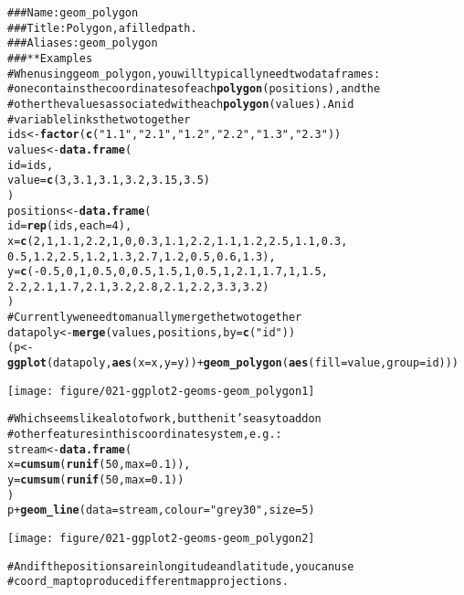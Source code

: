 \documentclass[a4paper,titlepage]{tufte-handout}\usepackage{graphicx, color}
\makeatletter
\def\maxwidth{ %
  \ifdim\Gin@nat@width>\linewidth
    \linewidth
  \else
    \Gin@nat@width
  \fi
}
\newcommand{\hlfunctioncall}[1]{\textcolor[rgb]{0.501960784313725,0,0.329411764705882}{\textbf{#1}}}%
\newcommand{\hlstring}[1]{\textcolor[rgb]{0.6,0.6,1}{#1}}%
\newcommand{\hlcomment}[1]{\textcolor[rgb]{0.180392156862745,0.6,0.341176470588235}{#1}}%
\newenvironment{kframe}{%
 \def\at@end@of@kframe{}%
 \ifinner\ifhmode%
  \def\at@end@of@kframe{\end{minipage}}%
  \begin{minipage}{\columnwidth}%
 \fi\fi%
 \def\FrameCommand##1{\hskip\@totalleftmargin \hskip-\fboxsep
 \colorbox{shadecolor}{##1}\hskip-\fboxsep
     \hskip-\linewidth \hskip-\@totalleftmargin \hskip\columnwidth}%
 \MakeFramed {\advance\hsize-\width
   \@totalleftmargin\z@ \linewidth\hsize
   \@setminipage}}%
 {\par\unskip\endMakeFramed%
 \at@end@of@kframe}
\newenvironment{knitrout}{}{} %
\makeatother
\begin{document}
\begin{knitrout}
\color{fgcolor}\begin{kframe}
\begin{alltt}
\hlcomment{### Name: geom_polygon}
\hlcomment{### Title: Polygon, a filled path.}
\hlcomment{### Aliases: geom_polygon}
\hlcomment{### ** Examples}
\hlcomment{# When using geom_polygon, you will typically need two data frames:}
\hlcomment{# one contains the coordinates of each \hlfunctioncall{polygon} (positions),  and the}
\hlcomment{# other the values associated with each \hlfunctioncall{polygon} (values).  An id}
\hlcomment{# variable links the two together}
ids <- \hlfunctioncall{factor}(\hlfunctioncall{c}(\hlstring{"1.1"}, \hlstring{"2.1"}, \hlstring{"1.2"}, \hlstring{"2.2"}, \hlstring{"1.3"}, \hlstring{"2.3"}))
values <- \hlfunctioncall{data.frame}(
  id = ids,
  value = \hlfunctioncall{c}(3, 3.1, 3.1, 3.2, 3.15, 3.5)
)
positions <- \hlfunctioncall{data.frame}(
  id = \hlfunctioncall{rep}(ids, each = 4),
  x = \hlfunctioncall{c}(2, 1, 1.1, 2.2, 1, 0, 0.3, 1.1, 2.2, 1.1, 1.2, 2.5, 1.1, 0.3,
  0.5, 1.2, 2.5, 1.2, 1.3, 2.7, 1.2, 0.5, 0.6, 1.3),
  y = \hlfunctioncall{c}(-0.5, 0, 1, 0.5, 0, 0.5, 1.5, 1, 0.5, 1, 2.1, 1.7, 1, 1.5,
  2.2, 2.1, 1.7, 2.1, 3.2, 2.8, 2.1, 2.2, 3.3, 3.2)
)
\hlcomment{# Currently we need to manually merge the two together}
datapoly <- \hlfunctioncall{merge}(values, positions, by=\hlfunctioncall{c}(\hlstring{"id"}))
(p <- \hlfunctioncall{ggplot}(datapoly, \hlfunctioncall{aes}(x=x, y=y)) + \hlfunctioncall{geom_polygon}(\hlfunctioncall{aes}(fill=value, group=id)))
\end{alltt}
\end{kframe}\texttt{[image: figure/021-ggplot2-geoms-geom\_polygon1]} \begin{kframe}\begin{alltt}
\hlcomment{# Which seems like a lot of work, but then it's easy to add on}
\hlcomment{# other features in this coordinate system, e.g.:}
stream <- \hlfunctioncall{data.frame}(
  x = \hlfunctioncall{cumsum}(\hlfunctioncall{runif}(50, max = 0.1)),
  y = \hlfunctioncall{cumsum}(\hlfunctioncall{runif}(50,max = 0.1))
)
p + \hlfunctioncall{geom_line}(data = stream, colour=\hlstring{"grey30"}, size = 5)
\end{alltt}
\end{kframe}\texttt{[image: figure/021-ggplot2-geoms-geom\_polygon2]} \begin{kframe}\begin{alltt}
\hlcomment{# And if the positions are in longitude and latitude, you can use}
\hlcomment{# coord_map to produce different map projections.}
\end{alltt}
\end{kframe}
\end{knitrout}
\end{document}
